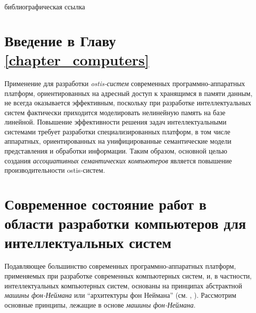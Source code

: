 \begin{SCn}
\begin{scnrelfromlist}{библиографическая ссылка}
\end{scnrelfromlist}

\end{SCn}

\section*{Введение в Главу \ref{chapter_computers}}

Применение для разработки \textit{ostis-систем} современных программно-аппаратных платформ, ориентированных на адресный доступ к хранящимся в памяти данным, не всегда оказывается эффективным, поскольку при разработке интеллектуальных систем фактически приходится моделировать нелинейную память на базе линейной. Повышение эффективности решения задач интеллектуальными системами требует разработки специализированных платформ, в том числе аппаратных, ориентированных на унифицированные семантические модели представления и обработки информации. Таким образом, основной целью создания \textit{ассоциативных семантических компьютеров} является повышение производительности ostis-систем.

\section{Современное состояние работ в области разработки компьютеров для интеллектуальных систем}
\label{sec_comp_curr_state}

Подавляющее большинство современных программно-аппаратных платформ, применяемых при разработке современных компьютерных систем, и, в частности, интеллектуальных компьютерных систем, основаны на принципах абстрактной \textit{машины фон-Неймана} или ``архитектуры фон Неймана'' (см. , ). Рассмотрим основные принципы, лежащие в основе \textit{машины фон-Неймана}.

